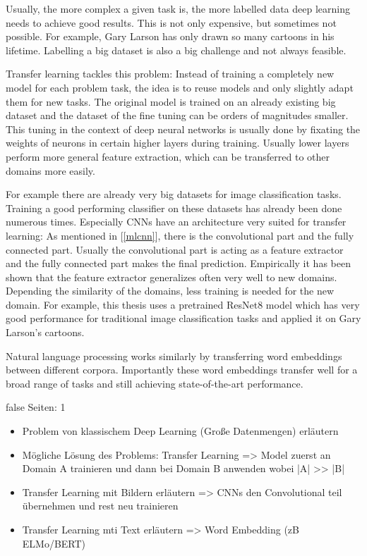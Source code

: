 \documentclass[draft,final,oneside]{vutinfth} %
\begin{document}
Usually, the more complex a given task is, the more labelled data deep learning needs to achieve good results. This is not only expensive, but sometimes not possible. For example, Gary Larson has only drawn so many cartoons in his lifetime. Labelling a big dataset is also a big challenge and not always feasible.

Transfer learning tackles this problem: Instead of training a completely new model for each problem task, the idea is to reuse models and only slightly adapt them for new tasks. The original model is trained on an already existing big dataset and the dataset of the fine tuning can be orders of magnitudes smaller. This tuning in the context of deep neural networks is usually done by fixating the weights of neurons in certain higher layers during training. Usually lower layers perform more general feature extraction, which can be transferred to other domains more easily.

For example there are already very big datasets for image classification tasks. Training a good performing classifier on these datasets has already been done numerous times. Especially CNNs have an architecture very suited for transfer learning: As mentioned in [\ref{mlcnn}], there is the convolutional part and the fully connected part. Usually the convolutional part is acting as a feature extractor and the fully connected part makes the final prediction. Empirically it has been shown that the feature extractor generalizes often very well to new domains. Depending the similarity of the domains, less training is needed for the new domain. For example, this thesis uses a pretrained ResNet8 model which has very good performance for traditional image classification tasks and applied it on Gary Larson's cartoons.

Natural language processing works similarly by transferring word embeddings between different corpora. Importantly these word embeddings transfer well for a broad range of tasks and still achieving state-of-the-art performance. \cite{elmo}


\if false
Seiten: 1
\begin{itemize}
\item Problem von klassischem Deep Learning (Große Datenmengen) erläutern
\item Mögliche Lösung des Problems: Transfer Learning => Model zuerst an Domain A trainieren und dann bei Domain B anwenden wobei |A| >> |B|
\item Transfer Learning mit Bildern erläutern => CNNs den Convolutional teil übernehmen und rest neu trainieren
\item Transfer Learning mti Text erläutern => Word Embedding (zB ELMo/BERT)
\end{itemize}
\fi
\end{document}
